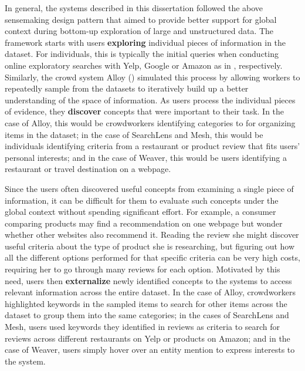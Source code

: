 In general, the systems described in this dissertation followed the above sensemaking design pattern that aimed to provide better support for global context during bottom-up exploration of large and unstructured data. The framework starts with users \textbf{exploring} individual pieces of information in the dataset. For individuals, this is typically the initial queries when conducting online exploratory searches with Yelp, Google or Amazon as in , respectively. Similarly, the crowd system Alloy () simulated this process by allowing workers to repeatedly sample from the datasets to iteratively build up a better understanding of the space of information. As users process the individual pieces of evidence, they \textbf{discover} concepts that were important to their task. In the case of Alloy, this would be crowdworkers identifying categories to for organizing items in the dataset; in the case of SearchLens and Mesh, this would be individuals identifying criteria from a restaurant or product review that fits users’ personal interests; and in the case of Weaver, this would be users identifying a restaurant or travel destination on a webpage. 

Since the users often discovered useful concepts from examining a single piece of information, it can be difficult for them to evaluate such concepts under the global context without spending significant effort. For example, a consumer comparing products may find a recommendation on one webpage but wonder whether other websites also recommend it. Reading the review she might discover useful criteria about the type of product she is researching, but figuring out how all the different options performed for that specific criteria can be very high costs, requiring her to go through many reviews for each option. Motivated by this need, users then \textbf{externalize} newly identified concepts to the systems to access relevant information across the entire dataset. In the case of Alloy, crowdworkers highlighted keywords in the sampled items to search for other items across the dataset to group them into the same categories; in the cases of SearchLens and Mesh, users used keywords they identified in reviews as criteria to search for reviews across different restaurants on Yelp or products on Amazon; and in the case of Weaver, users simply hover over an entity mention to express interests to the system. 

